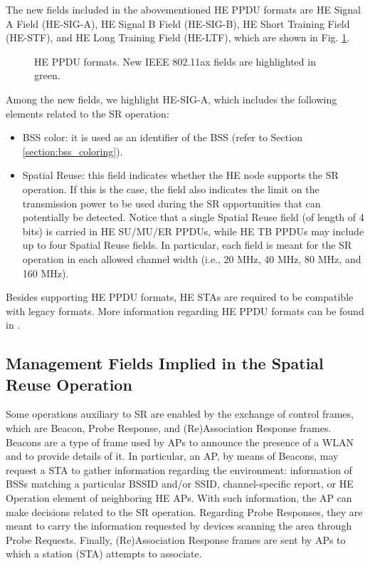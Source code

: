 \documentclass[comsoc]{IEEEtran}
\begin{document}
	The new fields included in the abovementioned HE PPDU formats are HE Signal A Field (HE-SIG-A), HE Signal B Field (HE-SIG-B), HE Short Training Field (HE-STF), and HE Long Training Field (HE-LTF), which are shown in Fig. \ref{fig:appendix_1}.
	\begin{figure}[ht!]
		\centering
		\caption{HE PPDU formats. New IEEE 802.11ax fields are highlighted in green.}
		\label{fig:appendix_1}
	\end{figure}
	
	Among the new fields, we highlight HE-SIG-A, which includes the following elements related to the SR operation:
		\begin{itemize}
			\item BSS color: it is used as an identifier of the BSS (refer to Section \ref{section:bss_coloring}).
			\item Spatial Reuse: this field indicates whether the HE node supports the SR operation. If this is the case, the field also indicates the limit on the transmission power to be used during the SR opportunities that can potentially be detected. Notice that a single Spatial Reuse field (of length of 4 bits) is carried in HE SU/MU/ER PPDUs,  while HE TB PPDUs may include up to four Spatial Reuse fields. In particular, each field is meant for the SR operation in each allowed channel width (i.e., 20 MHz, 40 MHz, 80 MHz, and 160 MHz).
	\end{itemize}
	
	Besides supporting HE PPDU formats, HE STAs are required to be compatible with legacy formats. More information regarding HE PPDU formats can be found in \cite{rhode2017whitepaper}. 
	
	\subsection{Management Fields Implied in the Spatial Reuse Operation}
	Some operations auxiliary to SR are enabled by the exchange of control frames, which are Beacon, Probe Response, and (Re)Association Response frames. Beacons are a type of frame used by APs to announce the presence of a WLAN and to provide details of it. In particular, an AP, by means of Beacons, may request a STA to gather information regarding the environment: information of BSSs matching a particular BSSID and/or SSID, channel-specific report, or HE Operation element of neighboring HE APs. With such information, the AP can make decisions related to the SR operation. Regarding Probe Responses, they are meant to carry the information requested by devices scanning the area through Probe Requests. Finally, (Re)Association Response frames are sent by APs to which a station (STA) attempts to associate.
	
\end{document}
